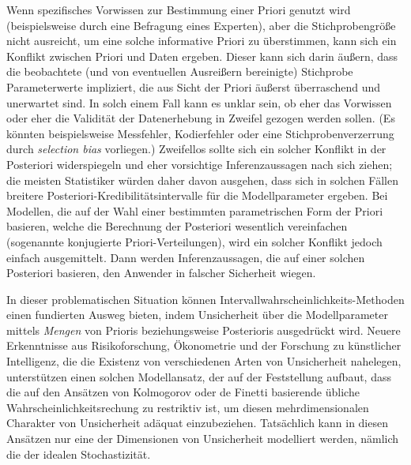 Wenn spezifisches Vorwissen zur Bestimmung einer Priori genutzt wird (beispielsweise durch eine Befragung eines Experten),
aber die Stichprobengröße nicht ausreicht, um eine solche informative Priori zu überstimmen,
kann sich ein Konflikt zwischen Priori und Daten ergeben.
Dieser kann sich darin äußern, dass die beobachtete (und von eventuellen Ausreißern bereinigte)
Stichprobe Parameterwerte impliziert, die aus Sicht der Priori äußerst überraschend und unerwartet sind.
In solch einem Fall kann es unklar sein, ob eher das Vorwissen oder eher die Validität der
Datenerhebung in Zweifel gezogen werden sollen.
(Es könnten beispielsweise Messfehler, Kodierfehler oder eine Stichprobenverzerrung durch \emph{selection bias} vorliegen.)
Zweifellos sollte sich ein solcher Konflikt in der Posteriori widerspiegeln
und eher vorsichtige Inferenzaussagen nach sich ziehen;
die meisten Statistiker würden daher davon ausgehen,
dass sich in solchen Fällen breitere Posteriori-Kredibilitätsintervalle für die Modellparameter ergeben.
Bei Modellen, die auf der Wahl einer bestimmten parametrischen Form der Priori basieren,
welche die Berechnung der Posteriori wesentlich vereinfachen
(sogenannte konjugierte Priori-Verteilungen),
wird ein solcher Konflikt jedoch einfach ausgemittelt.
Dann werden Inferenzaussagen, die auf einer solchen Posteriori basieren, den Anwender in falscher Sicherheit wiegen.

In dieser problematischen Situation können Intervallwahrscheinlichkeits-Methoden einen
fundierten Ausweg bieten, indem Unsicherheit über die Modellparameter mittels
\emph{Mengen} von Prioris beziehungsweise Posterioris ausgedrückt wird.
Neuere Erkenntnisse aus Risikoforschung, Ökonometrie und der Forschung zu künstlicher Intelligenz,
die die Existenz von verschiedenen Arten von Unsicherheit nahelegen,
unterstützen einen solchen Modellansatz,
der auf der Feststellung aufbaut, dass die
auf den Ansätzen von Kolmogorov oder de Finetti basierende
übliche Wahrscheinlichkeitsrechung zu restriktiv ist,
um diesen mehrdimensionalen Charakter von Unsicherheit adäquat einzubeziehen.
Tatsächlich kann in diesen Ansätzen 
nur eine der Dimensionen von Unsicherheit modelliert werden,
nämlich die der idealen Stochastizität.

